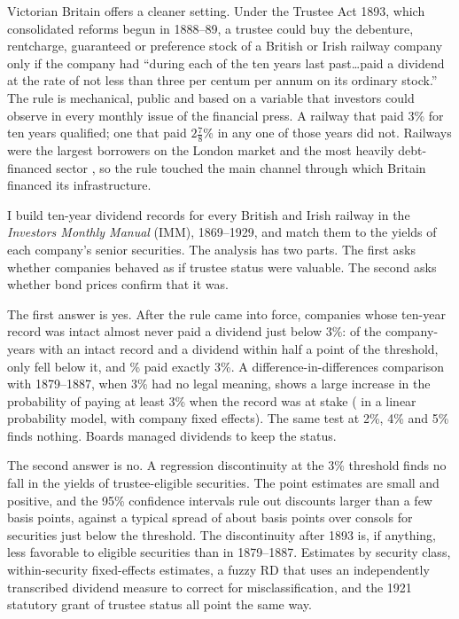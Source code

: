 \documentclass[11pt]{article}
\begin{document}
Victorian Britain offers a cleaner setting. Under the Trustee Act 1893, which consolidated reforms begun in 1888--89, a trustee could buy the debenture, rentcharge, guaranteed or preference stock of a British or Irish railway company only if the company had ``during each of the ten years last past\ldots paid a dividend at the rate of not less than three per centum per annum on its ordinary stock.'' The rule is mechanical, public and based on a variable that investors could observe in every monthly issue of the financial press. A railway that paid 3\% for ten years qualified; one that paid $2\tfrac{7}{8}$\% in any one of those years did not. Railways were the largest borrowers on the London market and the most heavily debt-financed sector \citep{GoetzmannRouwenhorst2026}, so the rule touched the main channel through which Britain financed its infrastructure.

I build ten-year dividend records for every British and Irish railway in the \textit{Investors Monthly Manual} (IMM), 1869--1929, and match them to the yields of each company's senior securities. The analysis has two parts. The first asks whether companies behaved as if trustee status were valuable. The second asks whether bond prices confirm that it was.

The first answer is yes. After the rule came into force, companies whose ten-year record was intact almost never paid a dividend just below 3\%: of the \nStake{} company-years with an intact record and a dividend within half a point of the threshold, only \belowStake{} fell below it, and \exactStake\% paid exactly 3\%. A difference-in-differences comparison with 1879--1887, when 3\% had no legal meaning, shows a large increase in the probability of paying at least 3\% when the record was at stake (\lpmInt{} in a linear probability model, \lpmfeInt{} with company fixed effects). The same test at 2\%, 4\% and 5\% finds nothing. Boards managed dividends to keep the status.

The second answer is no. A regression discontinuity at the 3\% threshold finds no fall in the yields of trustee-eligible securities. The point estimates are small and positive, and the 95\% confidence intervals rule out discounts larger than a few basis points, against a typical spread of about \meanSpreadNotElig{} basis points over consols for securities just below the threshold. The discontinuity after 1893 is, if anything, less favorable to eligible securities than in 1879--1887. Estimates by security class, within-security fixed-effects estimates, a fuzzy RD that uses an independently transcribed dividend measure to correct for misclassification, and the 1921 statutory grant of trustee status all point the same way.
\end{document}
